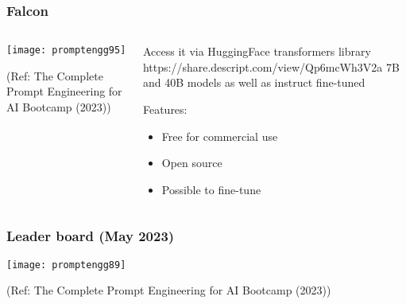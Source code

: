 \begin{frame}[fragile]\frametitle{Falcon}


\begin{columns}
    \begin{column}[T]{0.6\linewidth}
		\begin{center}
		\texttt{[image: promptengg95]}

		{\tiny (Ref: The Complete Prompt Engineering for AI Bootcamp (2023))}
		\end{center}	
    \end{column}
    \begin{column}[T]{0.4\linewidth}
		Access it via HuggingFace transformers library https://share.descript.com/view/Qp6mcWh3V2a
		7B and 40B models as well as instruct fine-tuned
		
		Features:
		\begin{itemize}
		\item Free for commercial use
		\item Open source
		\item Possible to fine-tune
		\end{itemize}	 

    \end{column}
  \end{columns}
\end{frame}






\begin{frame}[fragile]\frametitle{Leader board (May 2023)}


		\begin{center}
		\texttt{[image: promptengg89]}

		{\tiny (Ref: The Complete Prompt Engineering for AI Bootcamp (2023))}
		\end{center}	

\end{frame}

